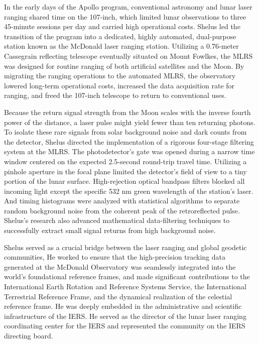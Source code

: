In the early days of the Apollo program, conventional astronomy and lunar laser ranging shared time on the 107-inch, which limited lunar observations to three 45-minute sessions per day and carried high operational costs. Shelus led the transition of the program into a dedicated, highly automated, dual-purpose station known as the McDonald laser ranging station. Utilizing a 0.76-meter Cassegrain reflecting telescope eventually situated on Mount Fowlkes, the MLRS was designed for routine ranging of both artificial satellites and the Moon. By migrating the ranging operations to the automated MLRS, the observatory lowered long-term operational costs, increased the data acquisition rate for ranging, and freed the 107-inch telescope to return to conventional uses. 

Because the return signal strength from the Moon scales with the inverse fourth power of the distance, a laser pulse might yield fewer than ten returning photons. To isolate these rare signals from solar background noise and dark counts from the detector, Shelus directed the implementation of a rigorous four-stage filtering system at the MLRS. The photodetector's gate was opened during a narrow time window centered on the expected 2.5-second round-trip travel time. Utilizing a pinhole aperture in the focal plane limited the detector's field of view to a tiny portion of the lunar surface. High-rejection optical bandpass filters blocked all incoming light except the specific 532 nm green wavelength of the station's laser. And timing histograms were analyzed with statistical algorithms to separate random background noise from the coherent peak of the retroreflected pulse. Shelus’s research also advanced mathematical data-filtering techniques to successfully extract small signal returns from high background noise.

Shelus served as a crucial bridge between the laser ranging and global geodetic communities, He worked to ensure that the high-precision tracking data generated at the McDonald Observatory was seamlessly integrated into the world's foundational reference frames, and made significant contributions to the International Earth Rotation and Reference Systems Service, the International Terrestrial Reference Frame, and the dynamical realization of the celestial reference frame. He was deeply embedded in the administrative and scientific infrastructure of the IERS. He served as the director of the lunar laser ranging coordinating center for the IERS and represented the community on the IERS directing board.


